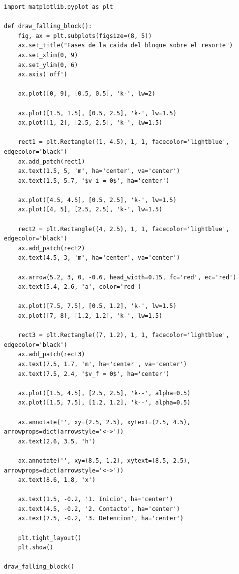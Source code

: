 \documentclass[12pt, a4paper]{article}
\begin{document}
\begin{lstlisting}
import matplotlib.pyplot as plt

def draw_falling_block():
    fig, ax = plt.subplots(figsize=(8, 5))
    ax.set_title("Fases de la caida del bloque sobre el resorte")
    ax.set_xlim(0, 9)
    ax.set_ylim(0, 6)
    ax.axis('off')

    ax.plot([0, 9], [0.5, 0.5], 'k-', lw=2)

    ax.plot([1.5, 1.5], [0.5, 2.5], 'k-', lw=1.5)
    ax.plot([1, 2], [2.5, 2.5], 'k-', lw=1.5)
    
    rect1 = plt.Rectangle((1, 4.5), 1, 1, facecolor='lightblue', edgecolor='black')
    ax.add_patch(rect1)
    ax.text(1.5, 5, 'm', ha='center', va='center')
    ax.text(1.5, 5.7, '$v_i = 0$', ha='center')

    ax.plot([4.5, 4.5], [0.5, 2.5], 'k-', lw=1.5)
    ax.plot([4, 5], [2.5, 2.5], 'k-', lw=1.5)
    
    rect2 = plt.Rectangle((4, 2.5), 1, 1, facecolor='lightblue', edgecolor='black')
    ax.add_patch(rect2)
    ax.text(4.5, 3, 'm', ha='center', va='center')
    
    ax.arrow(5.2, 3, 0, -0.6, head_width=0.15, fc='red', ec='red')
    ax.text(5.4, 2.6, 'a', color='red')

    ax.plot([7.5, 7.5], [0.5, 1.2], 'k-', lw=1.5)
    ax.plot([7, 8], [1.2, 1.2], 'k-', lw=1.5)
    
    rect3 = plt.Rectangle((7, 1.2), 1, 1, facecolor='lightblue', edgecolor='black')
    ax.add_patch(rect3)
    ax.text(7.5, 1.7, 'm', ha='center', va='center')
    ax.text(7.5, 2.4, '$v_f = 0$', ha='center')

    ax.plot([1.5, 4.5], [2.5, 2.5], 'k--', alpha=0.5)
    ax.plot([1.5, 7.5], [1.2, 1.2], 'k--', alpha=0.5)

    ax.annotate('', xy=(2.5, 2.5), xytext=(2.5, 4.5), arrowprops=dict(arrowstyle='<->'))
    ax.text(2.6, 3.5, 'h')

    ax.annotate('', xy=(8.5, 1.2), xytext=(8.5, 2.5), arrowprops=dict(arrowstyle='<->'))
    ax.text(8.6, 1.8, 'x')

    ax.text(1.5, -0.2, '1. Inicio', ha='center')
    ax.text(4.5, -0.2, '2. Contacto', ha='center')
    ax.text(7.5, -0.2, '3. Detencion', ha='center')

    plt.tight_layout()
    plt.show()

draw_falling_block()
\end{lstlisting}
\end{document}
